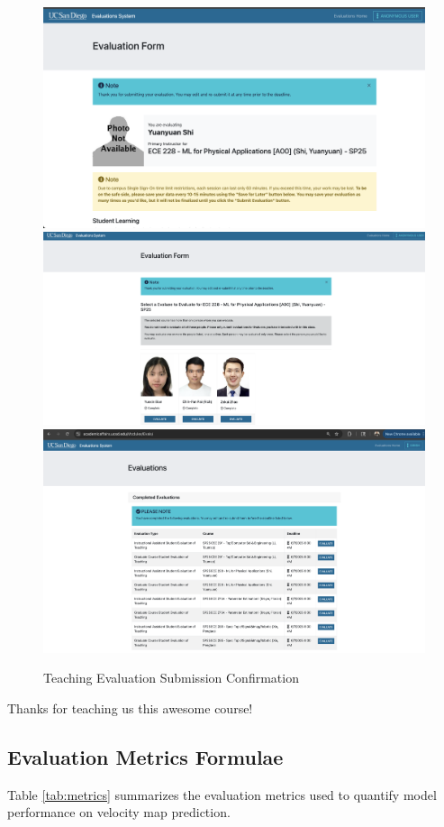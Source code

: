 \documentclass{article}
\begin{document}
\begin{figure}[H]
    \centering
    \includegraphics[width=0.7\linewidth]{figures/teaching_evaluations/instructor_eval.png}
    \includegraphics[width=0.7\linewidth]{figures/teaching_evaluations/ta_eval.png}
    \includegraphics[width=0.9\linewidth]{figures/teaching_evaluations/set_eval.png}
    \caption{Teaching Evaluation Submission Confirmation}
    \label{fig:teaching_evaluation}
\end{figure}

Thanks for teaching us this awesome course!

\subsection*{Evaluation Metrics Formulae}
\label{appendix:metrics-table}

Table \ref{tab:metrics} summarizes the evaluation metrics used to quantify model performance on velocity map prediction.
\end{document}
